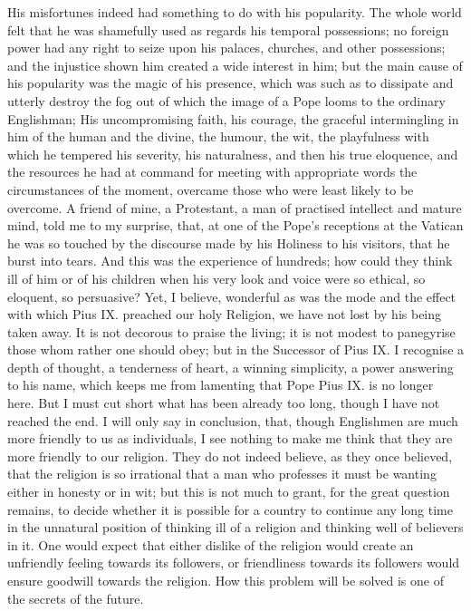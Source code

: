 His misfortunes indeed had something to do with his popularity. The
whole world felt that he was shamefully used as regards his temporal
possessions; no foreign power had any right to seize upon his palaces,
churches, and other possessions; and the injustice shown him created a
wide interest in him; but the main cause of his popularity was the
magic of his presence, which was such as to dissipate and utterly
destroy the fog out of which the image of a Pope looms to the ordinary
Englishman; His uncompromising faith, his courage, the graceful
intermingling in him of the human and the divine, the humour, the wit,
the playfulness with which he tempered his severity, his naturalness,
and then his true eloquence, and the resources he had at command for
meeting with appropriate words the circumstances of the moment,
overcame those who were least likely to be overcome. A friend of mine,
a Protestant, a man of practised intellect and mature mind, told me to
my surprise, that, at one of the Pope's receptions at the Vatican he
was so touched by the discourse made by his Holiness to his visitors,
that he burst into tears. And this was the experience of hundreds; how
could they think ill of him or of his children when his very look and
voice were so ethical, so eloquent, so persuasive? Yet, I believe,
wonderful as was the mode and the effect with which Pius IX. preached
our holy Religion, we have not lost by his being taken away. It is not
decorous to praise the living; it is not modest to panegyrise those
whom rather one should obey; but in the Successor of Pius IX. I
recognise a depth of thought, a tenderness of heart, a winning
simplicity, a power answering to his name, which keeps me from lamenting that Pope Pius IX. is no longer here. But I must cut short
what has been already too long, though I have not reached the end. I
will only say in conclusion, that, though Englishmen are much more
friendly to us as individuals, I see nothing to make me think that
they are more friendly to our religion. They do not indeed believe, as
they once believed, that the religion is so irrational that a man who
professes it must be wanting either in honesty or in wit; but this is
not much to grant, for the great question remains, to decide whether
it is possible for a country to continue any long time in the
unnatural position of thinking ill of a religion and thinking well of
believers in it. One would expect that either dislike of the religion
would create an unfriendly feeling towards its followers, or
friendliness towards its followers would ensure goodwill towards the
religion. How this problem will be solved is one of the secrets of the
future.

